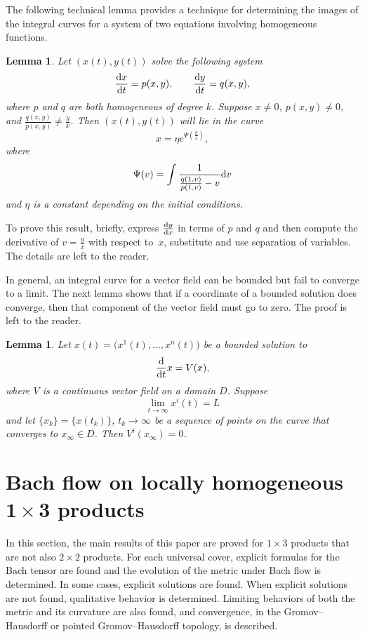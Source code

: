 \documentclass[10pt,a4paper]{amsart}
\numberwithin{equation}{section}
\newtheorem{Lemma}[Theorem]{Lemma}
\newcommand{\dtime}{\frac{{\rm d}}{{\rm d} t}} %
\begin{document}
The following technical lemma provides a technique for determining the images of the integral curves for a system of two equations involving homogeneous functions.

\begin{Lemma} \label{homogeneousodesolnlemma}
Let $(x(t), y(t))$ solve the following system
\begin{equation*}
\frac{{\rm d}x}{{\rm d}t} = p(x, y),\qquad \frac{{\rm d}y}{{\rm d}t} = q(x, y),
\end{equation*}
where $p$ and $q$ are both homogeneous of degree $k$. Suppose $x \neq 0$, $p(x,y) \neq 0$, and $\frac{q(x,y)}{p(x,y)} \neq \frac{y}{x}$. Then $(x(t), y(t))$ will lie in the curve
\[
x = \eta e^{\Psi \left(\frac{y}{x}\right)},
\]
where
\[
\Psi(v) = \int \frac{1}{\frac{q(1, v)}{p(1, v)} - v} {\rm d}v
\]
and $\eta$ is a constant depending on the initial conditions.
\end{Lemma}

To prove this result, briefly, express $\frac{{\rm d}y}{{\rm d}x}$ in terms of $p$ and $q$ and then compute the derivative of $v = \frac{y}{x}$ with respect to~$x$, substitute and use separation of variables. The details are left to the reader.

In general, an integral curve for a vector field can be bounded but fail to converge to a limit. The next lemma shows that if a coordinate of a bounded solution does converge, then that component of the vector field must go to zero. The proof is left to the reader.

\begin{Lemma} \label{odeconvergencelemma}
Let $x(t) = \big(x^1(t), \ldots, x^n(t)\big)$ be a bounded solution to
\[
\dtime x = V(x),
\]
where $V$ is a continuous vector field on a domain $D$. Suppose
\[
\lim_{t \rightarrow \infty} x^i(t) = L
\]
and let $\{x_k\} = \{x(t_k)\}$, $t_k \rightarrow \infty$ be a sequence of points on the curve that converges to $x_{\infty} \in D$. Then $V^i(x_{\infty}) = 0$.
\end{Lemma}

\section[Bach flow on locally homogeneous $1 \times 3$ products]{Bach flow on locally homogeneous $\boldsymbol{1 \times 3}$ products} \label{13flowsec}

In this section, the main results of this paper are proved for $1 \times 3$ products that are not also $2 \times 2$ products. For each universal cover, explicit formulas for the Bach tensor are found and the evolution of the metric under Bach flow is determined. In some cases, explicit solutions are found. When explicit solutions are not found, qualitative behavior is determined. Limiting behaviors of both the metric and its curvature are also found, and convergence, in the Gromov--Hausdorff or pointed Gromov--Hausdorff topology, is described.
\end{document}
